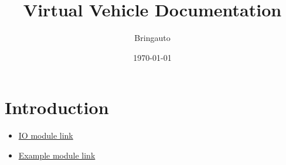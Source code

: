 \documentclass{article}
\title{Virtual Vehicle Documentation}
\author{Bringauto}
\date{\today}
\begin{document}
\maketitle %

\section{Introduction}

\begin{itemize}
    \item \href{\getref{io_module}}{IO module link}
    \item \href{\getref{example_module}}{Example module link}
\end{itemize}
\end{document}
